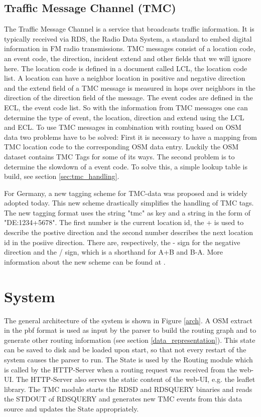 \documentclass[a4paper]{scrartcl}
\begin{document}
\subsection{Traffic Message Channel (TMC)}
The Traffic Message Channel is a service that broadcasts traffic information. It is typically received via RDS, the Radio Data System, a standard to embed digital information in FM radio transmissions. TMC messages consist of a location code, an event code, the direction, incident extend and other fields that we will ignore here. The location code is defined in a document called LCL, the location code list. A location can have a neighbor location in positive and negative direction and the extend field of a TMC message is measured in hops over neighbors in the direction of the direction field of the message. The event codes are defined in the ECL, the event code list. So with the information from TMC messages one can determine the type of event, the location, direction and extend using the LCL and ECL. To use TMC messages in combination with routing based on OSM data two problems have to be solved: First it is necessary to have a mapping from TMC location code to the corresponding OSM data entry. Luckily the OSM dataset contains TMC Tags for some of its ways. The second problem is to determine the slowdown of a event code. To solve this, a simple lookup table is build, see section \ref{sec:tmc_handling}. 

For Germany, a new tagging scheme for TMC-data was proposed and is widely adopted today. This new scheme drastically simplifies the handling of TMC tags. The new tagging format uses the string "tmc" as key and a string in the form of "DE:1234+5678". The first number is the current location id, the + is used to describe the postive direction and the second number describes the next location id in the posiive direction. There are, respectively, the - sign for the negative direction and the / sign, which is a shorthand for A+B and B-A. More information about the new scheme can be found at \cite{osm_wiki_tmc_new_scheme}.

\section{System}
\label{sys}
The general architecture of the system is shown in Figure \ref{arch}. A OSM extract in the pbf format is used as input by the parser to build the routing graph and to generate other routing information (see section \ref{data_representation}). This state can be saved to disk and be loaded upon start, so that not every restart of the system causes the parser to run. The State is used by the Routing module which is called by the HTTP-Server when a routing request was received from the web-UI. The HTTP-Server also serves the static content of the web-UI, e.g. the leaflet library. The TMC module starts the RDSD and RDSQUERY binaries and reads the STDOUT of RDSQUERY and generates new TMC events from this data source and updates the State appropriately.
\end{document}
